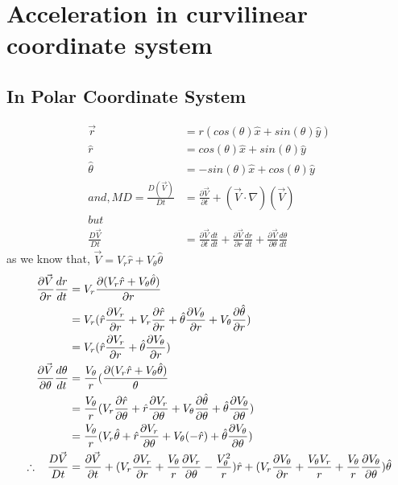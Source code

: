 \documentclass{book}
\begin{document}
\section{Acceleration in curvilinear coordinate system}
\subsection{In Polar Coordinate System}
\begin{equation*}
\begin{split}
\vec{r}&=r(cos(\theta)\hat{x}+sin(\theta)\hat{y})\\
\hat{r}&=cos(\theta)\hat{x}+sin(\theta)\hat{y}\\
\hat{\theta}&=-sin(\theta)\hat{x}+cos(\theta)\hat{y}\\
and,MD=\frac{D(\vec{V})}{Dt}&=\frac{\partial \vec{V}}{\partial t}+(\vec{V}\cdot\nabla)(\vec{V})\\but\\
\frac{D\vec{V}}{Dt}&=\frac{\partial \vec{V}}{\partial t}\frac{dt}{dt}+\frac{\partial \vec{V}}{\partial r}\frac{dr}{dt}+\frac{\partial \vec{V}}{\partial \theta}\frac{d\theta}{dt}
\end{split}
\end{equation*}
as we know that, $\vec{V}=V_r\hat{r}+V_\theta\hat{\theta}$\\
\begin{equation*}
\begin{split}
\frac{\partial \vec{V}}{\partial r}\frac{dr}{dt}&=V_r\frac{\partial (V_r\hat{r}+V_\theta\hat{\theta})}{\partial r}\\
&=V_r(\hat{r}\frac{\partial V_r}{\partial r}+V_r\frac{\partial \hat{r}}{\partial r}+\hat{\theta}\frac{\partial V_\theta}{\partial r}+V_\theta\frac{\partial \hat{\theta}}{\partial r})\\
&=V_r(\hat{r}\frac{\partial V_r}{\partial r}+\hat{\theta}\frac{\partial V_\theta}{\partial r})\\
\vspace{0.3cm}
\frac{\partial \vec{V}}{\partial \theta}\frac{d\theta}{dt}&=\frac{V_\theta}{r}(\frac{\partial  (V_r\hat{r}+V_\theta\hat{\theta})}{\theta} \\
&=\frac{V_\theta}{r}(V_r\frac{\partial \hat{r}}{\partial \theta}+\hat{r}\frac{\partial V_r}{\partial \theta}+V_\theta\frac{\partial \hat{\theta}}{\partial \theta}+\hat{\theta}\frac{\partial V_\theta}{\partial \theta})\\
&=\frac{V_\theta}{r}(V_r\hat{\theta}+\hat{r}\frac{\partial V_r}{\partial \theta}+V_\theta(-\hat{r})+\hat{\theta}\frac{\partial V_\theta}{\partial \theta})
\\
\therefore\hspace{0.3cm}\frac{D\vec{V}}{Dt}&=\frac{\partial \vec{V}}{\partial t}+(V_r\frac{\partial V_r}{\partial r}+\frac{V_\theta}{r}\frac{\partial V_r}{\partial \theta}-\frac{V_\theta^2}{r})\hat{r}+(V_r\frac{\partial V_\theta}{\partial r}+\frac{V_\theta V_r}{r}+\frac{V_\theta}{r}\frac{\partial V_\theta}{\partial \theta})\hat{\theta}
\end{split}
\end{equation*}
\\
\end{document}
